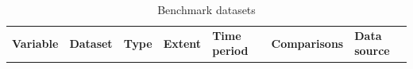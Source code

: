\documentclass[bg, manuscript]{copernicus}
\begin{document}
\begin{table}
\caption{Benchmark datasets}
%
%

\begin{tabular}{lllllll}
\textbf{Variable}                  & \textbf{Dataset}                       & \textbf{Type}                & \textbf{Extent} & \textbf{Time period}                                  & \textbf{Comparisons}                                                 & \textbf{Data source}                            \\


\end{tabular}
\end{table}
\end{document}
